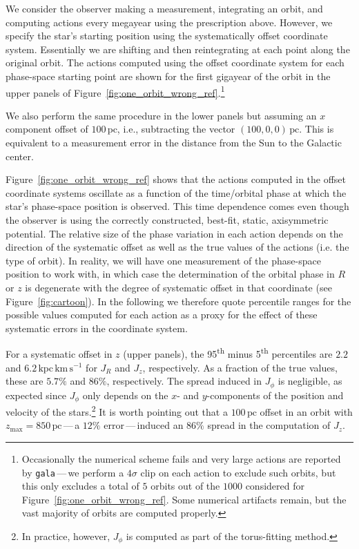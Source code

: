 \documentclass[twocolumn]{aastex62}
\newcommand{\pc}{\text{pc}}
\newcommand{\kms}{\text{km}\,\text{s}^{-1}}
\newcommand{\actunit}{\text{kpc}\,\kms}
\begin{document}
We consider the observer making a measurement, integrating an orbit, and
computing actions every megayear using the prescription above. However, we
specify the star's starting position using the systematically offset
coordinate system. Essentially we are shifting and then reintegrating at each
point along the original orbit. The actions computed using the offset
coordinate system for each phase-space starting point are shown for the first
gigayear of the orbit in the upper panels of
Figure~\ref{fig:one_orbit_wrong_ref}.\footnote{Occasionally the numerical
scheme fails and very large actions are reported by \texttt{gala}\,---\,we
perform a $4\sigma$ clip on each action to exclude such orbits, but this only
excludes a total of $5$ orbits out of the $1000$ considered for
Figure~\ref{fig:one_orbit_wrong_ref}. Some numerical artifacts remain, but the
vast majority of orbits are computed properly.}

We also perform the same procedure in the lower panels but assuming an $x$
component offset of $100\,\pc$, i.e., subtracting the vector $(100, 0,
0)\,\pc$. This is equivalent to a measurement error in the distance from the
Sun to the Galactic center.

Figure~\ref{fig:one_orbit_wrong_ref} shows that the actions computed in the
offset coordinate systems oscillate as a function of the time/orbital phase at
which the star's phase-space position is observed. This time dependence comes
even though the observer is using the correctly constructed, best-fit, static,
axisymmetric potential. The relative size of the phase variation in each
action depends on the direction of the systematic offset as well as the true
values of the actions (i.e. the type of orbit). In reality, we will have one
measurement of the phase-space position to work with, in which case the
determination of the orbital phase in $R$ or $z$ is degenerate with the degree
of systematic offset in that coordinate (see Figure~\ref{fig:cartoon}). In the
following we therefore quote percentile ranges for the possible values
computed for each action as a proxy for the effect of these systematic errors
in the coordinate system.

For a systematic offset in $z$ (upper panels), the 95\textsuperscript{th}
minus 5\textsuperscript{th} percentiles are $2.2$ and $6.2\,\actunit$ for
$J_R$ and $J_z$, respectively. As a fraction of the true values, these are
$5.7\%$ and $86\%$, respectively. The spread induced in $J_{\phi}$ is
negligible, as expected since $J_{\phi}$ only depends on the $x$- and
$y$-components of the position and velocity of the stars.\footnote{In
practice, however, $J_{\phi}$ is computed as part of the torus-fitting
method.} It is worth pointing out that a $100\,\pc$ offset in an orbit with
$z_{\text{max}}=850\,\pc$\,---\,a $12\%$ error\,---\,induced an $86\%$ spread
in the computation of $J_z$.
\end{document}
